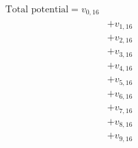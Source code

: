 \documentclass[preview]{standalone}
\begin{document}
\begin{align*}
\text{Total potential} = v_{0,16} \\ &+ v_{1,16} \\ &+ v_{2,16} \\ &+ v_{3,16} \\ &+ v_{4,16} \\ &+ v_{5,16} \\ &+ v_{6,16} \\ &+ v_{7,16} \\ &+ v_{8,16} \\ &+ v_{9,16}
\end{align*}
\end{document}
